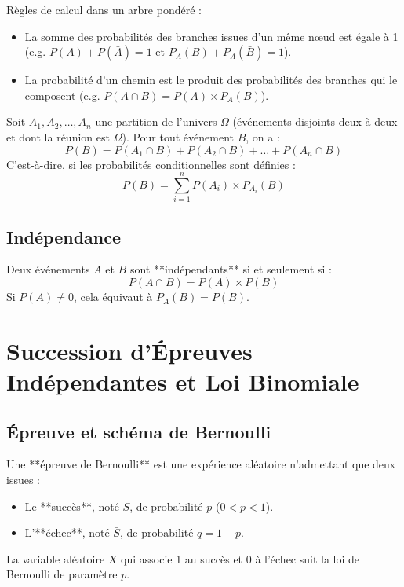 Règles de calcul dans un arbre pondéré :
\begin{itemize}
    \item La somme des probabilités des branches issues d'un même nœud est égale à 1 (e.g. $P(A) + P(\bar{A}) = 1$ et $P_A(B) + P_A(\bar{B}) = 1$).
    \item La probabilité d'un chemin est le produit des probabilités des branches qui le composent (e.g. $P(A \cap B) = P(A) \times P_A(B)$).
\end{itemize}

\begin{theoreme}
Soit $A_1, A_2, \dots, A_n$ une partition de l'univers $\Omega$ (événements disjoints deux à deux et dont la réunion est $\Omega$). Pour tout événement $B$, on a :
\[
P(B) = P(A_1 \cap B) + P(A_2 \cap B) + \dots + P(A_n \cap B)
\]
C'est-à-dire, si les probabilités conditionnelles sont définies :
\[
P(B) = \sum_{i=1}^n P(A_i) \times P_{A_i}(B)
\]
\end{theoreme}

\subsection{Indépendance}

\begin{definition}
Deux événements $A$ et $B$ sont **indépendants** si et seulement si :
\[
P(A \cap B) = P(A) \times P(B)
\]
Si $P(A) \ne 0$, cela équivaut à $P_A(B) = P(B)$.
\end{definition}

\section{Succession d'Épreuves Indépendantes et Loi Binomiale}

\subsection{Épreuve et schéma de Bernoulli}

\begin{definition}
Une **épreuve de Bernoulli** est une expérience aléatoire n'admettant que deux issues :
\begin{itemize}
    \item Le **succès**, noté $S$, de probabilité $p$ ($0 < p < 1$).
    \item L'**échec**, noté $\bar{S}$, de probabilité $q = 1-p$.
\end{itemize}
La variable aléatoire $X$ qui associe 1 au succès et 0 à l'échec suit la loi de Bernoulli de paramètre $p$.
\end{definition}

